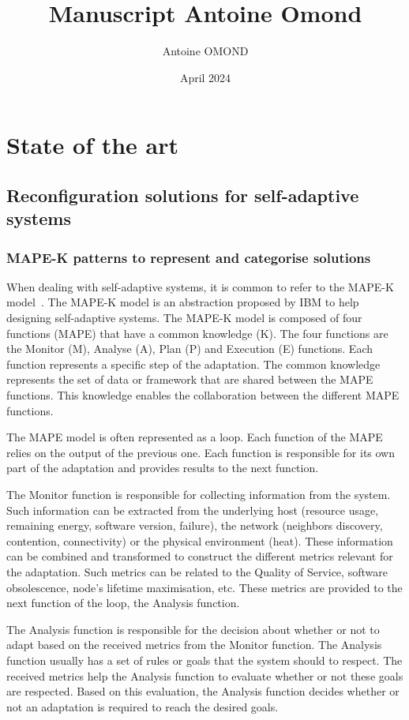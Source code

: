 \documentclass{article}
\title{Manuscript Antoine Omond}
\author{Antoine OMOND}
\date{April 2024}
\begin{document}
\maketitle

\section{State of the art}
\subsection{Reconfiguration solutions for self-adaptive systems}

\subsubsection{MAPE-K patterns to represent and categorise solutions}

When dealing with self-adaptive systems, it is common to refer to the MAPE-K model~\cite{kephart_vision_2003}. The MAPE-K model is an abstraction proposed by IBM to help designing self-adaptive systems. The MAPE-K model is composed of four functions (MAPE) that have a common knowledge (K). The four functions are the Monitor (M), Analyse (A), Plan (P) and Execution (E) functions. Each function represents a specific step of the adaptation. The common knowledge represents the set of data or framework that are shared between the MAPE functions. This knowledge enables the collaboration between the different MAPE functions.
 
The MAPE model is often represented as a loop. Each function of the MAPE relies on the output of the previous one. Each function is responsible for its own part of the adaptation and provides results to the next function. 

The Monitor function is responsible for collecting information from the system. Such information can be extracted from the underlying host (\eg resource usage, remaining energy, software version, failure), the network (\eg neighbors discovery, contention, connectivity) or the physical environment (\eg heat). These information can be combined and transformed to construct the different metrics relevant for the adaptation. Such metrics can be related to the Quality of Service, software obsolescence, node's lifetime maximisation, etc. These metrics are provided to the next function of the loop, the Analysis function.

The Analysis function is responsible for the decision about whether or not to adapt based on the received metrics from the Monitor function. The Analysis function usually has a set of rules or goals that the system should to respect. The received metrics help the Analysis function to evaluate whether or not these goals are respected. Based on this evaluation, the Analysis function decides whether or not an adaptation is required to reach the desired goals. 
\end{document}
